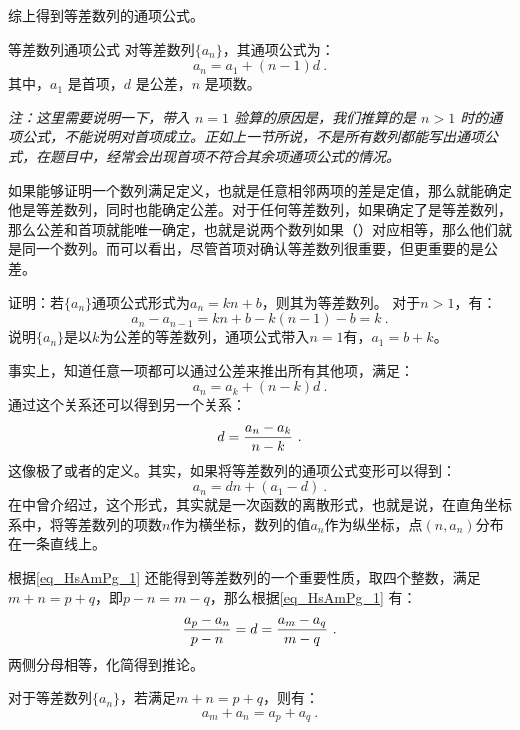 综上得到等差数列的通项公式。

\begin{corollary}{等差数列通项公式}
对等差数列$\{a_n\}$，其通项公式为：
\begin{equation}
a_n = a_1 + (n - 1)d~.
\end{equation}
其中，$a_1$ 是首项，$d$ 是公差，$n$ 是项数。
\end{corollary}

\textsl{注：这里需要说明一下，带入 $n = 1$ 验算的原因是，我们推算的是 $n > 1$ 时的通项公式，不能说明对首项成立。正如上一节所说，不是所有数列都能写出通项公式，在题目中，经常会出现首项不符合其余项通项公式的情况。}


如果能够证明一个数列满足定义，也就是任意相邻两项的差是定值，那么就能确定他是等差数列，同时也能确定公差。对于任何等差数列，如果确定了是等差数列，那么公差和首项就能唯一确定，也就是说两个数列如果（）对应相等，那么他们就是同一个数列。而可以看出，尽管首项对确认等差数列很重要，但更重要的是公差。
\begin{example}{证明：若$\{a_n\}$通项公式形式为$a_n=kn+b$，则其为等差数列。}
对于$n>1$，有：
\begin{equation}
a_n-a_{n-1}=kn+b-k(n-1)-b=k~.
\end{equation}
说明$\{a_n\}$是以$k$为公差的等差数列，通项公式带入$n=1$有，$a_1=b+k$。
\end{example}

事实上，知道任意一项都可以通过公差来推出所有其他项，满足：
\begin{equation}
a_n=a_k+(n-k)d~.
\end{equation}
通过这个关系还可以得到另一个关系：
\begin{equation}\label{eq_HsAmPg_1}
d={a_n-a_k\over n-k}~.
\end{equation}
这像极了或者的定义。其实，如果将等差数列的通项公式变形可以得到：
\begin{equation}
a_n=dn+(a_1-d)~.
\end{equation}
在中曾介绍过，这个形式，其实就是一次函数的离散形式，也就是说，在直角坐标系中，将等差数列的项数$n$作为横坐标，数列的值$a_n$作为纵坐标，点$(n,a_n)$分布在一条直线上。


根据\autoref{eq_HsAmPg_1} 还能得到等差数列的一个重要性质，取四个整数，满足$m+n=p+q$，即$p-n=m-q$，那么根据\autoref{eq_HsAmPg_1} 有：
\begin{equation}
{a_p-a_n\over p-n}=d={a_m-a_q\over m-q}~.
\end{equation}
两侧分母相等，化简得到推论。
\begin{corollary}{}\label{cor_HsAmPg_1}
对于等差数列$\{a_n\}$，若满足$m+n=p+q$，则有：
\begin{equation}
a_m+a_n=a_p+a_q~.
\end{equation}
\end{corollary}

